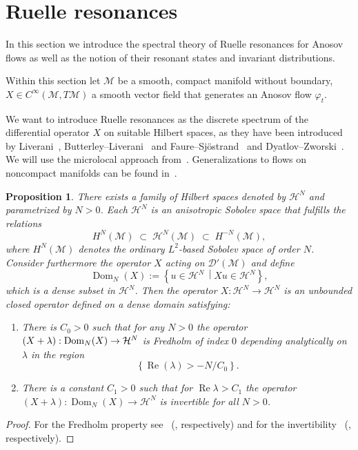\documentclass[10pt]{amsart}
\newtheorem{prop}[cdrthm]{Proposition}
\theoremstyle{definition}
\DeclareMathOperator{\Real}{Re}
\DeclareMathOperator{\Dom}{Dom}
\newcommand{\mc}{\mathcal}
\let\Re=\Real
\renewcommand{\Re}{\operatorname{Re}}
\begin{document}
\section{Ruelle resonances}\label{sec:PRR}
In this section we introduce the spectral theory of Ruelle resonances for Anosov flows as well as the notion of their resonant states and invariant distributions.

Within this section let $\mathcal M$ be a smooth, compact manifold without boundary, $X\in C^\infty(\mathcal M,T\mathcal M)$ a smooth vector field that generates an Anosov flow $\varphi_t$.

We want to introduce Ruelle resonances as the discrete spectrum of the differential operator $X$ on suitable Hilbert spaces, as they have been introduced by Liverani~\cite{Liv04}, Butterley--Liverani~\cite{BL07} and Faure--Sj\"ostrand~\cite{FSj11} and Dyatlov--Zworski~\cite{DZ16}. We will use the microlocal approach from~\cite{DZ16,FSj11}. Generalizations to flows on noncompact manifolds can be found in~\cite{DG16, BW17}.

\begin{prop}\label{thm:fredholm_property}
There exists a family of Hilbert spaces denoted by $\mc{H}^N$ and parametrized by $N>0$. Each $\mc{H}^N$ is an anisotropic Sobolev space that fulfills the relations
\[
H^N(\mc{M})\;\subset\;\mc{H}^N(\mathcal M)\;\subset\; H^{-N}(\mathcal M),
\]
where $H^N(\mathcal M)$ denotes the ordinary $L^2$-based Sobolev space of order $N$. Consider furthermore the operator $X$ acting on $\mathcal D'(\mathcal M)$ and define
\[
{\Dom}_{N}(X):=\left\{u\in \mc{H}^N\,\middle| X u\in \mc{H}^N\right\},
\]
which is a dense subset in $\mc{H}^N$. Then the operator $X: \mc{H}^N\to \mc{H}^N$ is an unbounded closed operator defined on a dense domain satisfying:
\begin{enumerate}
\item \label{list2.1.1}There is $C_0>0$ such that for any $N>0$ the operator $(X+\lambda):{\Dom}_{N}(X)\linebreak\to \mc{H}^N$ is Fredholm of index $0$ depending analytically on $\lambda$ in the region
\[
\left\{\Real(\lambda) >-N/C_0
\right\}.
\]
\item \label{list2.1.2}There is a constant $C_1>0$ such that for $\Re\lambda>C_1$ the operator $(X+\lambda):{\Dom}_{N}(X)\to \mc{H}^N$ is invertible for all $N>0$.
\end{enumerate}
\end{prop}

\begin{proof}
For the Fredholm property see~\cite[Theorem~1.4]{FSj11} (\cite[Proposition~3.2]{DZ16}, respectively) and for the invertibility~\cite[Lemma~3.3]{FSj11} (\cite[Proposition~3.1]{DZ16}, respectively).
\end{proof}
\end{document}
